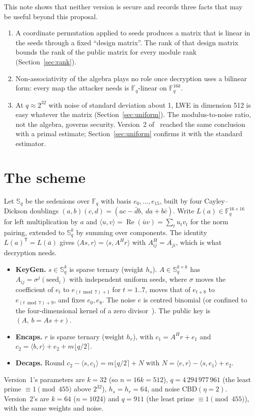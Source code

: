 \documentclass[11pt]{article}
\theoremstyle{remark}
\newcommand{\F}{\mathbb{F}}
\newcommand{\Sed}{\mathbb{S}}
\DeclareMathOperator{\re}{Re}
\begin{document}
This note shows that neither version is secure and records three facts that may be useful beyond this proposal.
\begin{enumerate}
\item A coordinate permutation applied to seeds produces a matrix that is linear in the seeds through a fixed
  ``design matrix''. The rank of that design matrix bounds the rank of the public matrix for every module rank
  (Section~\ref{sec:rank}).
\item Non-associativity of the algebra plays no role once decryption uses a bilinear form: every map the attacker needs
  is $\F_q$-linear on $\F_q^{16k}$.
\item At $q\approx2^{32}$ with noise of standard deviation about 1, LWE in dimension 512 is easy whatever the matrix
  (Section~\ref{sec:uniform}). The modulus-to-noise ratio, not the algebra, governs security. Version~2
  of~\cite{Gif26a} reached the same conclusion with a primal estimate; Section~\ref{sec:uniform} confirms it with the
  standard estimator.
\end{enumerate}

\section{The scheme}

Let $\Sed_q$ be the sedenions over $\F_q$ with basis $e_0,\dots,e_{15}$, built by four Cayley--Dickson doublings
$(a,b)(c,d)=(ac-\bar d b,\ da+b\bar c)$. Write $L(a)\in\F_q^{16\times16}$ for left multiplication by $a$ and
$\langle u,v\rangle=\re(\bar u v)=\sum_t u_t v_t$ for the norm pairing, extended to $\Sed_q^k$ by summing over
components. The identity $L(a)^{\mathsf T}=L(\bar a)$ gives $\langle A s,r\rangle=\langle s,A^{H}r\rangle$ with
$A^{H}_{ij}=\overline{A_{ji}}$, which is what decryption needs.

\begin{itemize}
\item \textbf{KeyGen.} $s\in\Sed_q^k$ is sparse ternary (weight $h_s$). $A\in\Sed_q^{k\times k}$ has
  $A_{ij}=\sigma^{j}(\mathrm{seed}_i)$ with independent uniform seeds, where $\sigma$ moves the coefficient of $e_t$ to
  $e_{(t\bmod7)+1}$ for $t=1..7$, moves that of $e_{t+8}$ to $e_{(t\bmod7)+9}$, and fixes $e_0,e_8$. The noise $e$ is
  centred binomial (or confined to the four-dimensional kernel of a zero divisor~\cite{Moreno}). The public key is $(A,\ b=As+e)$.
\item \textbf{Encaps.} $r$ is sparse ternary (weight $h_r$), with $c_1=A^{H}r+e_1$ and
  $c_2=\langle b,r\rangle+e_2+m\lfloor q/2\rceil$.
\item \textbf{Decaps.} Round $c_2-\langle s,c_1\rangle=m\lfloor q/2\rceil+N$ with
  $N=\langle e,r\rangle-\langle s,e_1\rangle+e_2$.
\end{itemize}
Version~1's parameters are $k=32$ (so $n=16k=512$), $q=4\,294\,977\,961$ (the least prime $\equiv1\pmod{455}$ above
$2^{32}$), $h_s=h_r=64$, and noise CBD$(\eta=2)$. Version~2's are $k=64$ ($n=1024$) and $q=911$ (the least prime
$\equiv1\pmod{455}$), with the same weights and noise.
\end{document}
